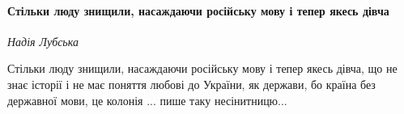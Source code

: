  
 
 
 
 
\paragraph{Стільки люду знищили, насаждаючи російську мову і тепер якесь дівча}

\emph{Надія Лубська}

Стільки люду знищили, насаждаючи російську мову і тепер якесь дівча, що не знає
історії і не має поняття любові до України, як держави, бо країна без державної
мови, це колонія ... пише таку несінитницю...
